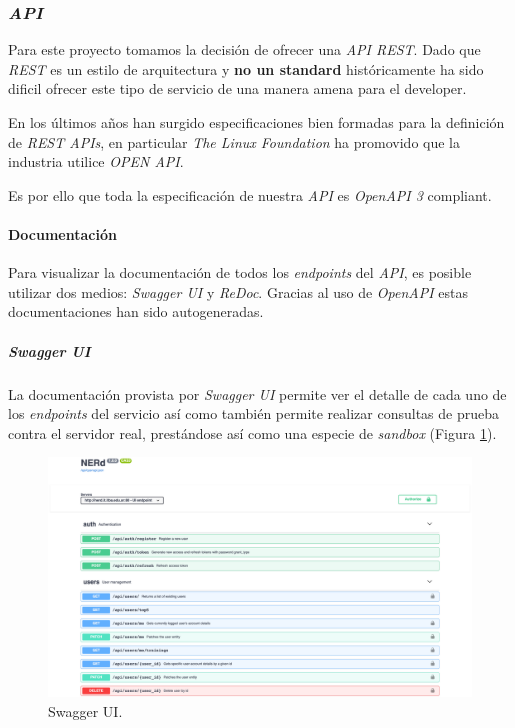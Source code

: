 \documentclass[12pt,a4paper,]{scrartcl}
\let\oldparagraph\paragraph
\renewcommand{\paragraph}[1]{\oldparagraph{#1}\mbox{}}
\let\oldsubparagraph\subparagraph
\renewcommand{\subparagraph}[1]{\oldsubparagraph{#1}\mbox{}}
\begin{document}
\hypertarget{api}{%
\subsubsection{\texorpdfstring{\emph{API}}{API}}\label{api}}

Para este proyecto tomamos la decisión de ofrecer una \emph{API REST}. Dado que \emph{REST} es un estilo de arquitectura y \textbf{no un standard} históricamente ha sido dificil ofrecer este tipo de servicio de una manera amena para el developer.

En los últimos años han surgido especificaciones bien formadas para la definición de \emph{REST APIs}, en particular \emph{The Linux Foundation} ha promovido que la industria utilice \emph{OPEN API}.

Es por ello que toda la especificación de nuestra \emph{API} es \emph{OpenAPI 3} compliant.

\hypertarget{documentaciuxf3n}{%
\paragraph{Documentación}\label{documentaciuxf3n}}

Para visualizar la documentación de todos los \emph{endpoints} del \emph{API}, es posible utilizar dos medios: \emph{Swagger UI} y \emph{ReDoc}. Gracias al uso de \emph{OpenAPI} estas documentaciones han sido autogeneradas.

\hypertarget{swagger-ui}{%
\subparagraph{\texorpdfstring{\emph{Swagger UI}}{Swagger UI}}\label{swagger-ui}}

La documentación provista por \emph{Swagger UI} permite ver el detalle de cada uno de los \emph{endpoints} del servicio así como también permite realizar consultas de prueba contra el servidor real, prestándose así como una especie de \emph{sandbox} (Figura \ref{fig:logic-swagger-main}).

\begin{figure}[H]

{\centering \includegraphics{assets/logic/swagger-main.pdf} 

}

\caption{Swagger UI.}\label{fig:logic-swagger-main}
\end{figure}
\end{document}
